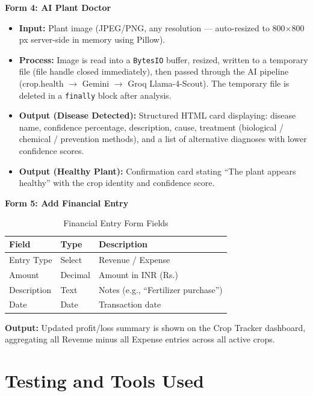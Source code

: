 \documentclass[12pt,a4paper]{article}
\begin{document}
\textbf{Form 4: AI Plant Doctor}

\begin{itemize}
    \item \textbf{Input:} Plant image (JPEG/PNG, any resolution --- auto-resized to 800$\times$800 px server-side in memory using Pillow).
    \item \textbf{Process:} Image is read into a \texttt{BytesIO} buffer, resized, written to a temporary file (file handle closed immediately), then passed through the AI pipeline (crop.health $\rightarrow$ Gemini $\rightarrow$ Groq Llama-4-Scout). The temporary file is deleted in a \texttt{finally} block after analysis.
    \item \textbf{Output (Disease Detected):} Structured HTML card displaying: disease name, confidence percentage, description, cause, treatment (biological / chemical / prevention methods), and a list of alternative diagnoses with lower confidence scores.
    \item \textbf{Output (Healthy Plant):} Confirmation card stating ``The plant appears healthy'' with the crop identity and confidence score.
\end{itemize}

\textbf{Form 5: Add Financial Entry}

\begin{table}[h]
\caption{Financial Entry Form Fields}
\centering
\begin{tabular}{|l|l|p{6cm}|}
\hline
\textbf{Field} & \textbf{Type} & \textbf{Description} \\ \hline
Entry Type & Select & Revenue / Expense \\ \hline
Amount & Decimal & Amount in INR (Rs.) \\ \hline
Description & Text & Notes (e.g., ``Fertilizer purchase'') \\ \hline
Date & Date & Transaction date \\ \hline
\end{tabular}
\end{table}

\noindent \textbf{Output:} Updated profit/loss summary is shown on the Crop Tracker dashboard, aggregating all Revenue minus all Expense entries across all active crops.

\section{Testing and Tools Used}
\end{document}
